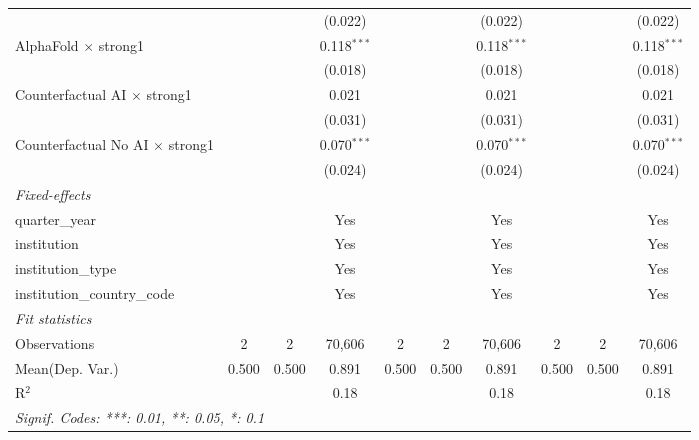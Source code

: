\begin{tabular}{lccccccccc}
                                          &     &     & (0.022)       &     &     & (0.022)       &     &     & (0.022)\\   
   AlphaFold $\times$ strong1             &     &     & 0.118$^{***}$ &     &     & 0.118$^{***}$ &     &     & 0.118$^{***}$\\   
                                          &     &     & (0.018)       &     &     & (0.018)       &     &     & (0.018)\\   
   Counterfactual AI $\times$ strong1     &     &     & 0.021         &     &     & 0.021         &     &     & 0.021\\   
                                          &     &     & (0.031)       &     &     & (0.031)       &     &     & (0.031)\\   
   Counterfactual No AI $\times$ strong1  &     &     & 0.070$^{***}$ &     &     & 0.070$^{***}$ &     &     & 0.070$^{***}$\\   
                                          &     &     & (0.024)       &     &     & (0.024)       &     &     & (0.024)\\   
   \midrule
   \emph{Fixed-effects}\\
   quarter\_year                          &     &     & Yes           &     &     & Yes           &     &     & Yes\\  
   institution                            &     &     & Yes           &     &     & Yes           &     &     & Yes\\  
   institution\_type                      &     &     & Yes           &     &     & Yes           &     &     & Yes\\  
   institution\_country\_code             &     &     & Yes           &     &     & Yes           &     &     & Yes\\  
   \midrule
   \emph{Fit statistics}\\
   Observations                           & 2   & 2   & 70,606        & 2   & 2   & 70,606        & 2   & 2   & 70,606\\  
Mean(Dep. Var.) & 0.500 & 0.500 & 0.891 & 0.500 & 0.500 & 0.891 & 0.500 & 0.500 & 0.891 \\
   R$^2$                                  &     &     & 0.18          &     &     & 0.18          &     &     & 0.18\\  
   \midrule \midrule
   \multicolumn{10}{l}{\emph{Signif. Codes: ***: 0.01, **: 0.05, *: 0.1}}\\
\end{tabular}
\par\endgroup
